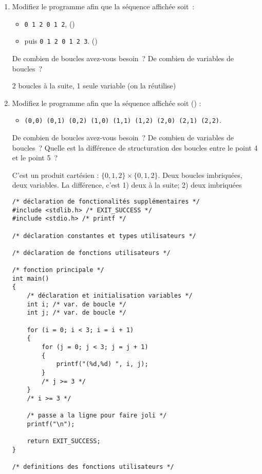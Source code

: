 \begin{enumerate}
\begin{correction}
  \end{correction}
\item Modifiez le programme afin que la séquence affichée soit~:
  \begin{itemize}
  \item \verb|0 1 2 0 1 2|, ()
  \item puis \verb|0 1 2 0 1 2 3|. ()
  \end{itemize}
  De combien de boucles avez-vous besoin~? De combien de variables de
  boucles~?

  \begin{correction}
    2 boucles à la suite, 1 seule variable (on la réutilise)
  \end{correction}

\item Modifiez le programme afin que la séquence affichée soit
  () :
  \begin{itemize}
  \item \verb|(0,0) (0,1) (0,2) (1,0) (1,1) (1,2) (2,0) (2,1) (2,2)|.
  \end{itemize}

  De combien de boucles avez-vous besoin~? De combien de variables de
  boucles~? Quelle est la différence de structuration
  des boucles entre le point 4 et le point 5~?

  \begin{correction}
    C'est un produit cartésien : $\{0,1,2\} \times \{0,1,2\}$. Deux boucles
    imbriquées, deux variables. La différence, c'est 1) deux à la suite; 2)
    deux imbriquées

\begin{verbatim}
/* déclaration de fonctionalités supplémentaires */
#include <stdlib.h> /* EXIT_SUCCESS */
#include <stdio.h> /* printf */

/* déclaration constantes et types utilisateurs */

/* déclaration de fonctions utilisateurs */

/* fonction principale */
int main()
{
    /* déclaration et initialisation variables */
    int i; /* var. de boucle */
    int j; /* var. de boucle */

    for (i = 0; i < 3; i = i + 1)
    {
        for (j = 0; j < 3; j = j + 1)
        {
            printf("(%d,%d) ", i, j);
        }
        /* j >= 3 */
    }
    /* i >= 3 */

    /* passe a la ligne pour faire joli */
    printf("\n");

    return EXIT_SUCCESS;
}

/* definitions des fonctions utilisateurs */
\end{verbatim}
\end{correction}

\end{enumerate}

